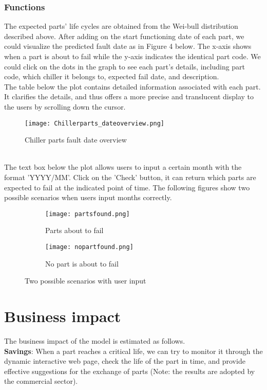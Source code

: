 \documentclass[11pt]{article}
\begin{document}
\subsubsection{Functions}
The expected parts’ life cycles are obtained from the Wei-bull distribution described above. After adding on the start functioning date of each part, we could visualize the predicted fault date as in Figure 4 below. The x-axis shows when a part is about to fail while the y-axis indicates the identical part code. We could click on the dots in the graph to see each part's details, including part code, which chiller it belongs to, expected fail date, and description.
\\
The table below the plot contains detailed information associated with each part. It clarifies the details, and thus offers a more precise and translucent display to the users by scrolling down the cursor. 
\\
\begin{figure}[h]
\centering\texttt{[image: Chillerparts\_dateoverview.png]} 
\caption{Chiller parts fault date overview}
\end{figure}
\\
The text box below the plot allows users to input a certain month with the format 'YYYY/MM'. Click on the 'Check' button, it can return which parts are expected to fail at the indicated point of time. The following figures show two possible scenarios when users input months correctly.
\\
\begin{figure}[h]
\begin{subfigure}{0.5\textwidth}
\texttt{[image: partsfound.png]} 
\caption{Parts about to fail}
\label{fig:subim1}
\end{subfigure}
\begin{subfigure}{0.5\textwidth}
\texttt{[image: nopartfound.png]}
\caption{No part is about to fail}
\label{fig:subim2}
\end{subfigure}
\caption{Two possible scenarios with user input}
\label{fig:image2}
\end{figure}

\section{Business impact}
The business impact of the model is estimated as follows.
\\
 \textbf{Savings}: When a part reaches a critical life, we can try to monitor it through the dynamic interactive web page, check the life of the part in time, and provide effective suggestions for the exchange of parts (Note: the results are adopted by the commercial sector).
\end{document}
